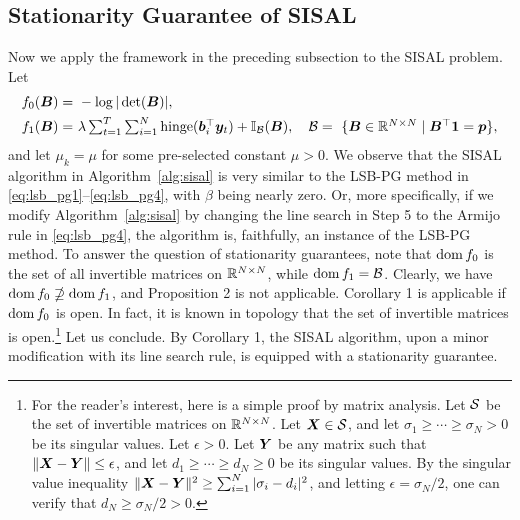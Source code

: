 \documentclass[10pt,twocolumn,twoside]{IEEEtran}
\begin{document}
\subsection{Stationarity Guarantee of SISAL}

Now we apply the framework in the preceding subsection to the SISAL problem.
Let
\begin{equation*}
\begin{split}
f_0({\bm B}) = &~- \log |\det({\bm B}) |,	\\
f_1({\bm B}) = &~\textstyle \lambda \sum_{t=1}^T \sum_{i=1}^N {\rm hinge}({\bm b}_i^\top {\bm y}_t ) + \mathbb{I}_{\mathcal{B}}({\bm B}), \quad \mathcal{B} =~ \{ {\bm B} \in \mathbb{R}^{N \times N} \mid {\bm B}^\top {\bm 1} = {\bm p} \},
\end{split}
\end{equation*}
and let $\mu_k = \mu$ for some pre-selected constant $\mu > 0$.
We observe that the SISAL algorithm in Algorithm~\ref{alg:sisal} is very similar to the LSB-PG method in \eqref{eq:lsb_pg1}--\eqref{eq:lsb_pg4}, with $\beta$ being nearly zero.
Or, more specifically, if we modify Algorithm~\ref{alg:sisal} by changing the line search in Step 5 to the Armijo rule in \eqref{eq:lsb_pg4}, the algorithm is, faithfully, an instance of the LSB-PG method.
To answer the question of stationarity guarantees, note that ${\rm dom}\, f_0$ is the set of all invertible matrices on $\mathbb{R}^{N \times N}$, while ${\rm dom}\, f_1 = \mathcal{B}$.
Clearly, we have ${\rm dom}\, f_0 \nsupseteq {\rm dom}\, f_1$, and Proposition 2 is not applicable.
Corollary 1 is applicable if  ${\rm dom}\, f_0$ is open.
In fact, it is known in topology that the set of invertible matrices is open.\footnote{For the reader's interest, here is a simple proof by matrix analysis.
	Let $\mathcal{S}$ be the set of invertible matrices on $\mathbb{R}^{N \times N}$.
	Let ${\bm X} \in \mathcal{S}$, and let $\sigma_1 \geq \cdots \geq \sigma_N > 0$ be its singular values.
	Let $\epsilon > 0$.
	Let ${\bm Y}$ be any matrix such that $\| {\bm X} - {\bm Y} \| \leq \epsilon$, and let $d_1  \geq \cdots \geq d_N \geq 0$ be its singular values.
	By the singular value inequality $\| {\bm X} - {\bm Y} \|^2 \geq \sum_{i=1}^N | \sigma_i - d_i |^2$, and letting $\epsilon = \sigma_N/2$, one can verify that $d_N \geq \sigma_N/2 > 0$.
}
Let us conclude. By Corollary 1, the SISAL algorithm, upon a minor modification with its line search rule, is equipped with a stationarity guarantee.
\end{document}
